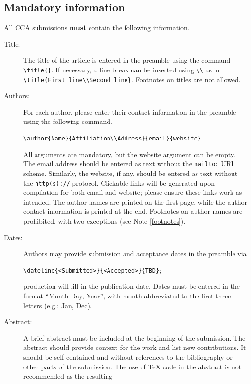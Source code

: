 \documentclass[12pt]{article}
\begin{document}
\subsection{Mandatory information}

All CCA submissions \textbf{must} contain the following information.

\begin{description}
\item[Title:] The title of the article is entered in the preamble
  using the command \verb|\title{}|. If necessary, a line break can be
  inserted using \verb|\\| as in
  \verb|\title{First line\\Second line}|.  Footnotes on titles are not
  allowed.
\item[Authors:] For each author, please enter their contact
  information in the preamble using the following command.
  \begin{center}
    \verb|\author{Name}{Affiliation\\Address}{email}{website}|
  \end{center}
  All arguments are mandatory, but the website argument can be empty.
  The email address should be entered as text without the
  \verb|mailto:| URI scheme. Similarly, the website, if any, should be
  entered as text without the \verb|http(s)://| protocol. Clickable
  links will be generated upon compilation for both email and website;
  please ensure these links work as intended. The author names are
  printed on the first page, while the author contact information is
  printed at the end.  Footnotes on author names are prohibited, with
  two exceptions (see Note \ref{footnotes}).
\item[Dates:] Authors may provide submission and acceptance dates in
  the preamble via
  \begin{center}
    \verb|\dateline{<Submitted>}{<Accepted>}{TBD}|;
  \end{center}
  production will fill in the publication date. Dates must be entered
  in the format ``Month Day, Year'', with month abbreviated to the
  first three letters (e.g.: Jan, Dec).
\item[Abstract:] A brief abstract must be included at the beginning of
  the submission.  The abstract should provide context for the work
  and list new contributions.  It should be self-contained and without
  references to the bibliography or other parts of the submission. The
  use of TeX code in the abstract is not recommended as the resulting

\end{description}
\end{document}
